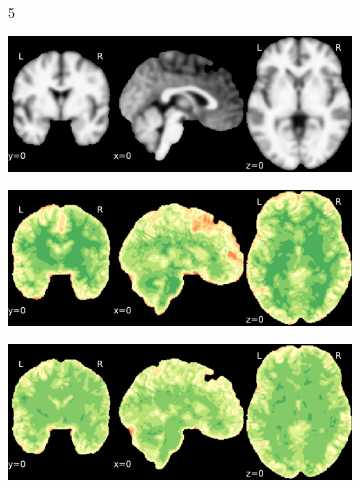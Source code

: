 \documentclass{article}
\begin{document}
\begin{landscape}
\begin{figure}
\begin{subfigure}[t]{0.2\paperheight}
        \end{subfigure} \\
        \begin{subfigure}[b][][c]{0.01\paperwidth} 5 \vspace*{15pt} \end{subfigure}
        \begin{subfigure}[t]{0.2\paperheight}
            \centering
            \includegraphics[width=\textwidth]{figures/ieee_T1/fwhm_5/ieee_ds001748_sub-adult15.pdf}
        \end{subfigure}
        \begin{subfigure}[t]{0.2\paperheight}
            \centering
            \includegraphics[width=\textwidth]{figures/sig/fwhm_5/rr_ds001748_sub-adult15_sig.pdf}
        \end{subfigure}
        \begin{subfigure}[t]{0.2\paperheight}
            \centering
            \includegraphics[width=\textwidth]{figures/sig/fwhm_5/rs_ds001748_sub-adult15_sig.pdf}

\end{subfigure}
\end{figure}
\end{landscape}
\end{document}
